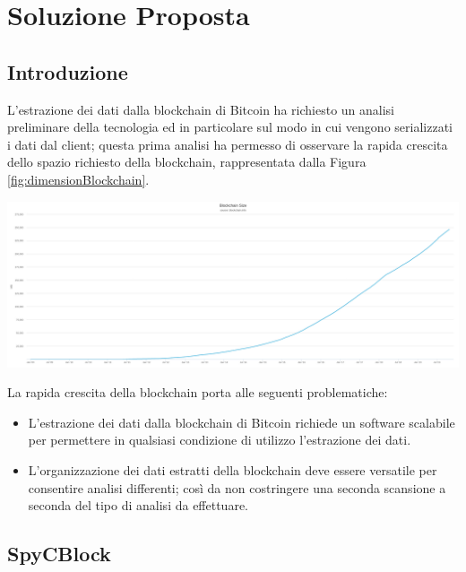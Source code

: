 \chapter{Soluzione Proposta}\label{chap:soluzioneproposta}

\section{Introduzione} \label{sec:solIntroduction}

L'estrazione dei dati dalla blockchain di Bitcoin ha richiesto un analisi preliminare della tecnologia ed in particolare sul modo in cui vengono serializzati i dati dal client; questa prima analisi ha permesso di osservare la rapida crescita dello spazio richiesto della blockchain, rappresentata dalla Figura \ref{fig:dimensionBlockchain}.

{\vspace{15pt}
\includegraphics[scale=0.18]{images/blockchain-size.png}
\vspace{10pt}
\par}

La rapida crescita della blockchain porta alle seguenti problematiche:

\begin{itemize}
  \item L'estrazione dei dati dalla blockchain di Bitcoin richiede un software scalabile per permettere in qualsiasi condizione di utilizzo l'estrazione dei dati.
  \item L'organizzazione dei dati estratti della blockchain deve essere versatile per consentire analisi differenti; così da non costringere una seconda scansione a seconda del tipo di analisi da effettuare.
\end{itemize}

\section{SpyCBlock} \label{sec:spycblock}

